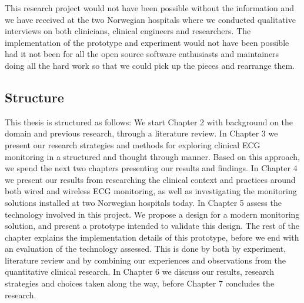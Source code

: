 This research project would not have been possible without the information and we have received at the two Norwegian hospitals where we conducted qualitative interviews on both clinicians, clinical engineers and researchers. The implementation of the prototype and experiment would not have been possible had it not been for all the open source software enthusiasts and maintainers doing all the hard work so that we could pick up the pieces and rearrange them.

\label{sub:contributions}

\subsection{Structure} 

This thesis is structured as follows: We start Chapter 2 with background on the domain and previous research, through a literature review. In Chapter 3 we present our research strategies and methods for exploring clinical ECG monitoring in a structured and thought through manner. Based on this approach, we spend the next two chapters presenting our results and findings. In Chapter 4 we present our results from researching the clinical context and practices around both wired and wireless ECG monitoring, as well as investigating the monitoring solutions installed at two Norwegian hospitals today. In Chapter 5 assess the technology involved in this project. We propose a design for a modern monitoring solution, and present a prototype intended to validate this design. The rest of the chapter explains the implementation details of this prototype, before we end with an evaluation of the technology assessed. This is done by both by experiment, literature review and by combining our experiences and observations from the quantitative clinical research. In Chapter 6 we discuss our results, research strategies and choices taken along the way, before Chapter 7 concludes the research.

\label{sub:structure}

